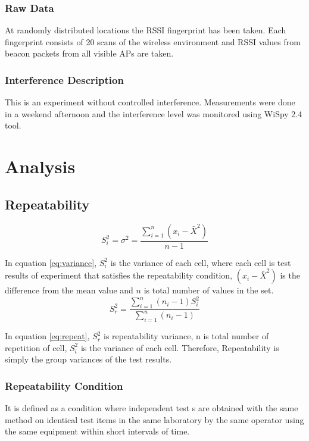 \documentclass[11pt,a4paper,headinclude,footinclude,chapterprefix=on]{scrreprt}
\begin{document}
\subsection{Raw Data} At randomly distributed locations the RSSI fingerprint has been taken. Each fingerprint consists of 20 scans of the wireless environment and RSSI values from beacon packets from all visible APs are taken.

\subsection{Interference Description} This is an experiment without controlled interference. Measurements were done in a weekend afternoon and the interference level was monitored using WiSpy 2.4 tool.

\chapter{Analysis} 
\section{Repeatability} \label{sec:repeat} \cite{ref:randr} \cite{ref:randr2}
\begin{equation}
	\label{eq:variance} {S}_i^2 = {\sigma}^2 = \frac{\sum\limits_{i=1}^{n} (x_{i} - \bar{X}^2)}{n-1} 
\end{equation}

In equation \ref{eq:variance}, $S_{i}^{2}$ is the variance of each cell, where each cell is test results of experiment that satisfies the repeatability condition, $(x_{i} - \bar{X}^2)$ is the difference from the mean value and $n$ is total number of values in the set. 
\begin{equation}
	\label{eq:repeat} {S}_r^2 = \frac{\sum\limits_{i=1}^{n} (n_{i} - 1){S}_i^2} {\sum\limits_{i=1}^{n}(n_{i} - 1)} 
\end{equation}

In equation \ref{eq:repeat}, ${S}_r^2$ is repeatability variance, n is total number of repetition of cell, $S_{i}^{2}$ is the variance of each cell. Therefore, Repeatability is simply the group variances of the test results.

\subsection{Repeatability Condition} It is defined as a condition where independent test s are obtained with the same method on identical test items in the same laboratory by the same operator using the same equipment within short intervals of time.
\end{document}
